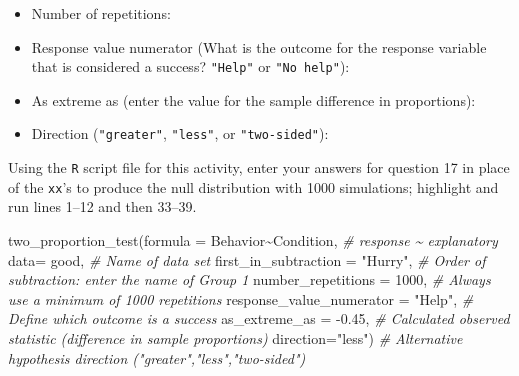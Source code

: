 \documentclass[
]{report}
\newenvironment{Shaded}{\begin{snugshade}}{\end{snugshade}}
\newcommand{\AttributeTok}[1]{\textcolor[rgb]{0.77,0.63,0.00}{#1}}
\newcommand{\CommentTok}[1]{\textcolor[rgb]{0.56,0.35,0.01}{\textit{#1}}}
\newcommand{\DecValTok}[1]{\textcolor[rgb]{0.00,0.00,0.81}{#1}}
\newcommand{\FloatTok}[1]{\textcolor[rgb]{0.00,0.00,0.81}{#1}}
\newcommand{\FunctionTok}[1]{\textcolor[rgb]{0.00,0.00,0.00}{#1}}
\newcommand{\NormalTok}[1]{#1}
\newcommand{\SpecialCharTok}[1]{\textcolor[rgb]{0.00,0.00,0.00}{#1}}
\newcommand{\StringTok}[1]{\textcolor[rgb]{0.31,0.60,0.02}{#1}}
\providecommand{\tightlist}{%
  \setlength{\itemsep}{0pt}\setlength{\parskip}{0pt}}
\begin{document}
\vspace{.2in}

\begin{itemize}
\tightlist
\item
  Number of repetitions:
\end{itemize}

\vspace{.2in}

\begin{itemize}
\tightlist
\item
  Response value numerator (What is the outcome for the response variable that is considered a success? \texttt{"Help"} or \texttt{"No\ help"}):
\end{itemize}

\vspace{.2in}

\begin{itemize}
\tightlist
\item
  As extreme as (enter the value for the sample difference in proportions):
\end{itemize}

\vspace{.2in}

\begin{itemize}
\tightlist
\item
  Direction (\texttt{"greater"}, \texttt{"less"}, or \texttt{"two-sided"}):
\end{itemize}

\vspace{.2in}

Using the \texttt{R} script file for this activity, enter your answers for question 17 in place of the \texttt{xx}'s to produce the null distribution with 1000 simulations; highlight and run lines 1--12 and then 33--39.

\begin{Shaded}
\begin{Highlighting}[]
\FunctionTok{two\_proportion\_test}\NormalTok{(}\AttributeTok{formula =}\NormalTok{ Behavior}\SpecialCharTok{\textasciitilde{}}\NormalTok{Condition, }\CommentTok{\# response \textasciitilde{} explanatory}
    \AttributeTok{data=}\NormalTok{ good, }\CommentTok{\# Name of data set}
    \AttributeTok{first\_in\_subtraction =} \StringTok{"Hurry"}\NormalTok{, }\CommentTok{\# Order of subtraction: enter the name of Group 1}
    \AttributeTok{number\_repetitions =} \DecValTok{1000}\NormalTok{, }\CommentTok{\# Always use a minimum of 1000 repetitions}
    \AttributeTok{response\_value\_numerator =} \StringTok{"Help"}\NormalTok{, }\CommentTok{\# Define which outcome is a success }
    \AttributeTok{as\_extreme\_as =} \SpecialCharTok{{-}}\FloatTok{0.45}\NormalTok{, }\CommentTok{\# Calculated observed statistic (difference in sample proportions)}
    \AttributeTok{direction=}\StringTok{"less"}\NormalTok{) }\CommentTok{\# Alternative hypothesis direction ("greater","less","two{-}sided")}
\end{Highlighting}
\end{Shaded}
\end{document}
